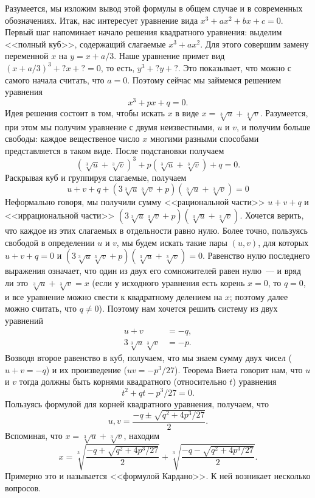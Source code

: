 \documentclass[a4paper,11pt]{scrartcl}
\theoremstyle{plain}
\theoremstyle{definition}
\begin{document}
Разумеется, мы изложим вывод этой формулы в общем случае и в
современных обозначениях.
Итак, нас интересует уравнение вида
$x^3 + ax^2 + bx + c = 0$.
Первый шаг напоминает начало решения квадратного уравнения: выделим
<<полный куб>>, содержащий слагаемые $x^3 + ax^2$. Для этого совершим
замену переменной $x$ на $y = x + a/3$.
Наше уравнение примет вид
$(x+a/3)^3 + ?x + ? = 0$, то есть, $y^3 + ?y + ?$.
Это показывает, что можно с самого начала считать, что $a=0$.
Поэтому сейчас мы займемся решением уравнения
$$
x^3 + px + q = 0.
$$
Идея решения состоит в том, чтобы искать $x$ в виде
$x = \sqrt[3]{u} + \sqrt[3]{v}$.
Разумеется, при этом мы получим уравнение с двумя неизвестными, $u$ и
$v$, и получим больше свободы: каждое вещественое число $x$ многими
разными способами представляется в таком виде.
После подстановки получаем
$$
(\sqrt[3]{u} + \sqrt[3]{v})^3 + p(\sqrt[3]{u} + \sqrt[3]{v}) + q = 0.
$$
Раскрывая куб и группируя слагаемые, получаем
$$
u + v + q + (3\sqrt[3]{u}\sqrt[3]{v} + p)(\sqrt[3]{u} + \sqrt[3]{v}) =
0
$$
Неформально говоря, мы получили сумму <<рациональной части>> $u+v+q$
и <<иррациональной части>>
$(3\sqrt[3]{u}\sqrt[3]{v} + p)(\sqrt[3]{u} + \sqrt[3]{v})$.
Хочется верить, что каждое из этих слагаемых в отдельности равно нулю.
Более точно, пользуясь свободой в определении $u$ и $v$, мы будем
искать такие пары $(u,v)$, для которых $u+v+q = 0$
и $(3\sqrt[3]{u}\sqrt[3]{v} + p)(\sqrt[3]{u} + \sqrt[3]{v}) = 0$.
Равенство нулю последнего выражения означает, что один из двух его
сомножителей равен нулю~--- и вряд ли это
$\sqrt[3]{u} + \sqrt[3]{v} = x$ (если у исходного уравнения есть
корень $x=0$, то $q=0$, и все уравнение можно свести к квадратному
делением на $x$; поэтому далее можно считать, что $q\neq 0$).
Поэтому нам хочется решить систему из двух уравнений
\begin{align*}
u + v &= -q,\\
3\sqrt[3]{u}\sqrt[3]{v} &= -p.
\end{align*}
Возводя второе равенство в куб, получаем, что мы знаем сумму двух
чисел ($u+v = -q$) и их произведение ($uv = -p^3/27$).
Теорема Виета говорит нам, что $u$ и $v$ тогда должны быть корнями
квадратного (относительно $t$) уравнения
$$
t^2 + qt - p^3/27 = 0.
$$
Пользуясь формулой для корней квадратного уравнения, получаем, что
$$
u,v = \frac{-q\pm\sqrt{q^2+4p^3/27}}{2}.
$$
Вспоминая, что $x = \sqrt[3]{u} + \sqrt[3]{v}$, находим
$$
x = \sqrt[3]{\frac{-q+\sqrt{q^2+4p^3/27}}{2}}
+\sqrt[3]{\frac{-q-\sqrt{q^2+4p^3/27}}{2}}.
$$
Примерно это и называется <<формулой Кардано>>. К ней возникает
несколько вопросов.
\end{document}
